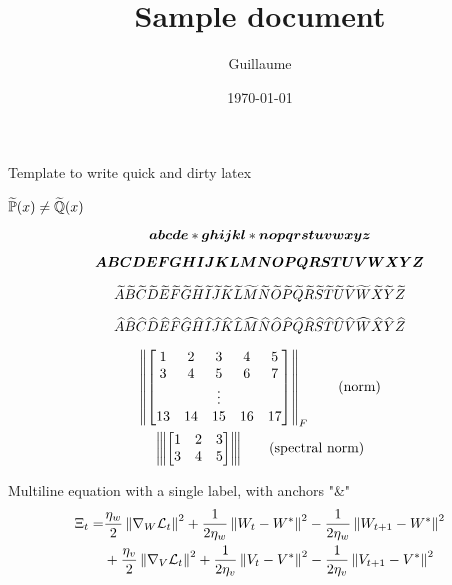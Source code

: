 \documentclass{article}
\title{Sample document}
\author{Guillaume}
\date{\today}
\begin{document}
\maketitle

Template to write quick and dirty latex


\TODO{}

$\tPP(x) \neq \tQQ(x)$

\begin{equation}
\ba \bb \bc \bd \be * \bg \bh \bi \bj \bk \bl * \bn \bo \bp \bq \br \bs \bt \bu \bv \bw \bx \by \bz
\end{equation}

\begin{equation}
\bA \bB \bC \bD \bE \bF \bG \bH \bI \bJ \bK \bL \bM \bN \bO \bP \bQ \bR \bS \bT \bU \bV \bW \bX \bY \bZ
\end{equation}

\begin{equation}
\tA \tB \tC \tD \tE \tF \tG \tH \tI \tJ \tK \tL \tM \tN \tO \tP \tQ \tR \tS \tT \tU \tV \tW \tX \tY \tZ
\end{equation}

\begin{equation}
\hA \hB \hC \hD \hE \hF \hG \hH \hI \hJ \hK \hL \hM \hN \hO \hP \hQ \hR \hS \hT \hU \hV \hW \hX \hY \hZ
\end{equation}

\begin{gather}
    \norm{
    \begin{bmatrix}
        1 & 2 & 3 & 4 & 5 \\
        3 & 4 & 5 & 6 & 7 \\
        && \vdots && \\
        13 & 14 & 15 & 16 & 17 \\
    \end{bmatrix}
    }_F \label{eq:norm} \tag{norm} \\
    \spnorm{
    \begin{bmatrix}
        1 & 2 & 3 \\
        3 & 4 & 5
    \end{bmatrix}
    } \label{eq:spnorm} \tag{spectral norm}
\end{gather}

Multiline equation with a single label, with anchors "\&"
\begin{equation}
\begin{split}
    \Xi_t =& \frac{\eta_w}{2}\norm{\nabla_{W} \LLL_t}^2 + \frac{1}{2\eta_w}\norm{W_t - W^*}^2 - \frac{1}{2\eta_w}\norm{W_{t+1} - W^*}^2 \\ 
    &+ \frac{\eta_v}{2}\norm{\nabla_{V} \LLL_t}^2 + \frac{1}{2\eta_v}\norm{V_t - V^*}^2 - \frac{1}{2\eta_v}\norm{V_{t+1} - V^*}^2 
\end{split}
\end{equation}
\end{document}
